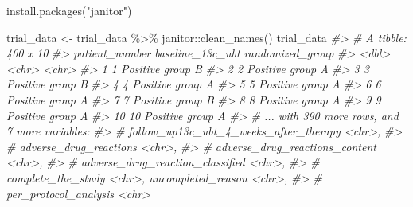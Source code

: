 \documentclass[
]{book}
\newenvironment{Shaded}{\begin{snugshade}}{\end{snugshade}}
\newcommand{\CommentTok}[1]{\textcolor[rgb]{0.56,0.35,0.01}{\textit{#1}}}
\newcommand{\FunctionTok}[1]{\textcolor[rgb]{0.00,0.00,0.00}{#1}}
\newcommand{\NormalTok}[1]{#1}
\newcommand{\OtherTok}[1]{\textcolor[rgb]{0.56,0.35,0.01}{#1}}
\newcommand{\SpecialCharTok}[1]{\textcolor[rgb]{0.00,0.00,0.00}{#1}}
\newcommand{\StringTok}[1]{\textcolor[rgb]{0.31,0.60,0.02}{#1}}
\begin{document}
\begin{Shaded}
\begin{Highlighting}[]
\FunctionTok{install.packages}\NormalTok{(}\StringTok{"janitor"}\NormalTok{)}
\end{Highlighting}
\end{Shaded}

\begin{Shaded}
\begin{Highlighting}[]
\NormalTok{trial\_data }\OtherTok{\textless{}{-}}\NormalTok{ trial\_data }\SpecialCharTok{\%\textgreater{}\%} 
\NormalTok{  janitor}\SpecialCharTok{::}\FunctionTok{clean\_names}\NormalTok{() }
\NormalTok{trial\_data}
\CommentTok{\#\textgreater{} \# A tibble: 400 x 10}
\CommentTok{\#\textgreater{}    patient\_number baseline\_13c\_ubt randomized\_group}
\CommentTok{\#\textgreater{}             \textless{}dbl\textgreater{} \textless{}chr\textgreater{}            \textless{}chr\textgreater{}           }
\CommentTok{\#\textgreater{}  1              1 Positive         group B         }
\CommentTok{\#\textgreater{}  2              2 Positive         group A         }
\CommentTok{\#\textgreater{}  3              3 Positive         group B         }
\CommentTok{\#\textgreater{}  4              4 Positive         group A         }
\CommentTok{\#\textgreater{}  5              5 Positive         group A         }
\CommentTok{\#\textgreater{}  6              6 Positive         group A         }
\CommentTok{\#\textgreater{}  7              7 Positive         group B         }
\CommentTok{\#\textgreater{}  8              8 Positive         group A         }
\CommentTok{\#\textgreater{}  9              9 Positive         group A         }
\CommentTok{\#\textgreater{} 10             10 Positive         group A         }
\CommentTok{\#\textgreater{} \# ... with 390 more rows, and 7 more variables:}
\CommentTok{\#\textgreater{} \#   follow\_up13c\_ubt\_4\_weeks\_after\_therapy \textless{}chr\textgreater{},}
\CommentTok{\#\textgreater{} \#   adverse\_drug\_reactions \textless{}chr\textgreater{},}
\CommentTok{\#\textgreater{} \#   adverse\_drug\_reactions\_content \textless{}chr\textgreater{},}
\CommentTok{\#\textgreater{} \#   adverse\_drug\_reaction\_classified \textless{}chr\textgreater{},}
\CommentTok{\#\textgreater{} \#   complete\_the\_study \textless{}chr\textgreater{}, uncompleted\_reason \textless{}chr\textgreater{},}
\CommentTok{\#\textgreater{} \#   per\_protocol\_analysis \textless{}chr\textgreater{}}
\end{Highlighting}
\end{Shaded}
\end{document}
